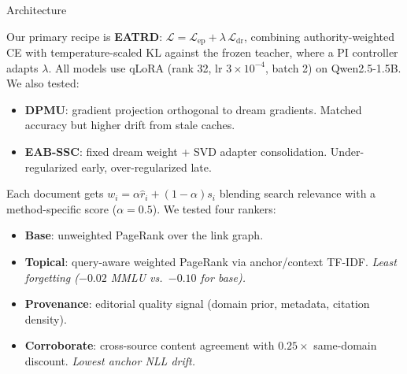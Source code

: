 \begin{block}{Architecture}

    Our primary recipe is \textbf{EATRD}: $\mathcal{L} = \mathcal{L}_{\mathrm{ep}} + \lambda\, \mathcal{L}_{\mathrm{dr}}$, combining authority-weighted CE with temperature-scaled KL against the frozen teacher, where a PI controller adapts $\lambda$. All models use qLoRA (rank 32, lr $3\!\times\!10^{-4}$, batch 2) on Qwen2.5-1.5B. We also tested:
    \begin{itemize}\setlength{\itemsep}{4pt}
        \item \textbf{DPMU}: gradient projection orthogonal to dream gradients. Matched accuracy but higher drift from stale caches.
        \item \textbf{EAB-SSC}: fixed dream weight + SVD adapter consolidation. Under-regularized early, over-regularized late.
    \end{itemize}


    Each document gets $w_i = \alpha \hat{r}_i + (1\!-\!\alpha) s_i$ blending search relevance with a method-specific score ($\alpha\!=\!0.5$). We tested four rankers:
    \begin{itemize}\setlength{\itemsep}{4pt}
        \item \textbf{Base}: unweighted PageRank over the link graph.
        \item \textbf{Topical}: query-aware weighted PageRank via anchor/context TF-IDF. \textcolor{cardinal}{\emph{Least forgetting ($-0.02$ MMLU vs.\ $-0.10$ for base).}}
        \item \textbf{Provenance}: editorial quality signal (domain prior, metadata, citation density).
        \item \textbf{Corroborate}: cross-source content agreement with $0.25\times$ same-domain discount. \textcolor{cardinal}{\emph{Lowest anchor NLL drift.}}
    \end{itemize}

  \end{block}

